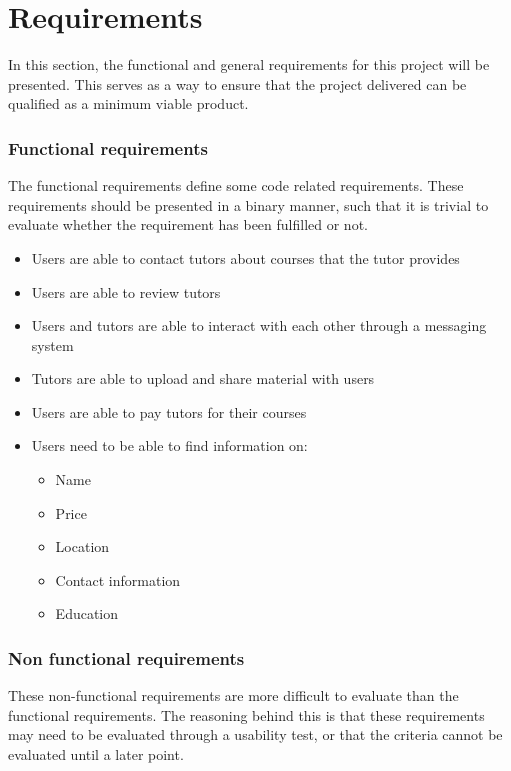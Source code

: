 \section{Requirements}
In this section, the functional and general requirements for this project will be presented.
This serves as a way to ensure that the project delivered can be qualified as a minimum viable product.

\subsubsection{Functional requirements}
The functional requirements define some code related requirements. These requirements should be presented in a binary manner, such that it is trivial to evaluate whether the requirement has been fulfilled or not.

\begin{itemize}
    \item Users are able to contact tutors about courses that the tutor provides
    \item Users are able to review tutors
    \item Users and tutors are able to interact with each other through a messaging system
    \item Tutors are able to upload and share material with users
    \item Users are able to pay tutors for their courses
    \item Users need to be able to find information on:
    \begin{itemize}
        \item Name
        \item Price
        \item Location
        \item Contact information
        \item Education
    \end{itemize}
\end{itemize}

\subsubsection{Non functional requirements}
These non-functional requirements are more difficult to evaluate than the functional requirements.
The reasoning behind this is that these requirements may need to be evaluated through a usability test, or that the criteria cannot be evaluated until a later point. 

